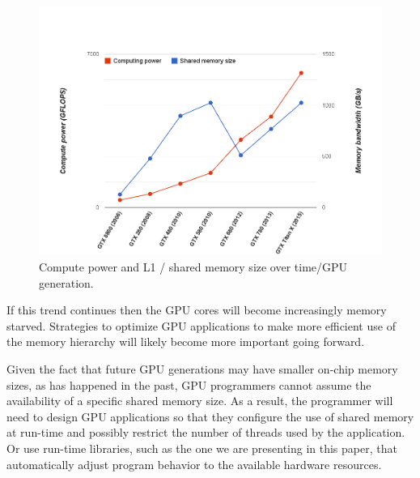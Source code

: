 \begin{figure}
\center
\includegraphics[scale=0.26]{computevsshared.png}
\caption{\footnotesize\textnormal{Compute power and  L1 / shared memory size over time/GPU generation.}}
\label{fig:memsize}
\end{figure}

If this trend continues then the GPU cores will become increasingly memory starved.
Strategies to optimize GPU applications to make more efficient use of the memory hierarchy will likely become more important going forward.

Given the fact that future GPU generations may have smaller on-chip memory sizes, as has happened in
the past, GPU programmers cannot assume the availability of a specific shared memory size.
As a result, the programmer will need to design GPU applications so that they configure the use of
shared memory at run-time and possibly restrict the number of threads used by the application.
Or use run-time libraries, such as the one we are presenting in this paper, that automatically
adjust program behavior to the available hardware resources.

